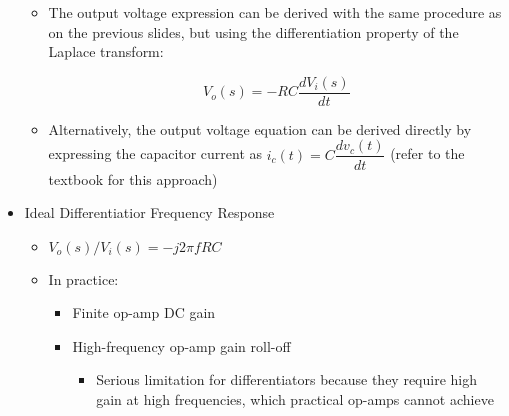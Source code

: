 \begin{itemize}
    \begin{itemize}

      \item The output voltage expression can be derived with the same procedure as on the previous slides, but using the differentiation property of the Laplace transform:

        $$V_o(s)=-RC\frac{dV_i(s)}{dt}$$

      \item Alternatively, the output voltage equation can be derived directly by expressing the capacitor current as $i_c(t)=C\dfrac{dv_c(t)}{dt}$ (refer to the textbook for this approach)
        
    \end{itemize}

  \item Ideal Differentiatior Frequency Response

    \begin{itemize}

      \item $V_o(s)/V_i(s)=-j2\pi fRC$

      \item In practice:

        \begin{itemize}

          \item Finite op-amp DC gain

          \item High-frequency op-amp gain roll-off

            \begin{itemize}

              \item Serious limitation for differentiators because they require high gain at high frequencies, which practical op-amps cannot achieve

            \end{itemize}

        \end{itemize}

    \end{itemize}

\end{itemize}



